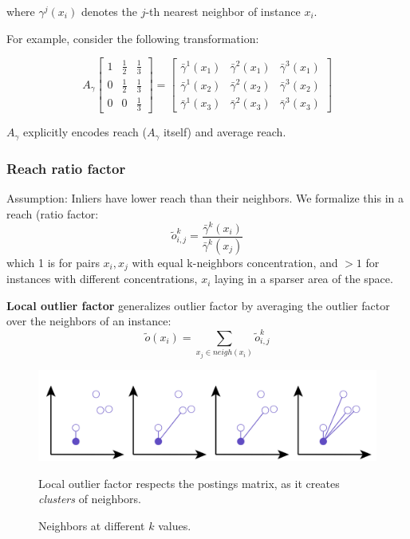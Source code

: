 where $\gamma^j(x_i)$ denotes the $j$-th nearest neighbor of instance $x_i$.

For example, consider the following transformation:

\[
A_{\gamma} \begin{bmatrix}
1 & \frac{1}{2} & \frac{1}{3} \\
0 & \frac{1}{2} & \frac{1}{3} \\
0 & 0 & \frac{1}{3}
\end{bmatrix} = \begin{bmatrix}
\bar{\gamma}^1(x_1) & \bar{\gamma}^2(x_1) & \bar{\gamma}^3(x_1) \\
\bar{\gamma}^1(x_2) & \bar{\gamma}^2(x_2) & \bar{\gamma}^3(x_2) \\
\bar{\gamma}^1(x_3) & \bar{\gamma}^2(x_3) & \bar{\gamma}^3(x_3)
\end{bmatrix}
\]

$A_{\gamma}$ explicitly encodes reach ($A_{\gamma}$ itself) and average reach.

\subsubsection{Reach ratio factor}
Assumption: Inliers have lower reach than their neighbors. We formalize this in a reach
(ratio factor:
\[
   \tilde{o}^k_{i,j} = \frac{\bar{\gamma}^k(x_i)}{\bar{\gamma}^k(x_j)}
\]
which 1 is for pairs $x_i,x_j$ with equal k-neighbors concentration, and $>1$  for instances
with different concentrations, $x_i$ laying in a sparser area of the space.
\nl

\begin{paracol}{2}

   \colfill
	\textbf{Local outlier factor} generalizes outlier factor by averaging the outlier factor over the
	neighbors of an instance:
	\[
		\tilde{o}(x_i) = \sum_{x_j \in neigh(x_i)} \tilde{o}^k_{i,j}
	\]
   \colfill

	\switchcolumn

	\begin{figure}[htbp]
		\centering
		\includegraphics[width=0.9\columnwidth]{images/06/reachneighbors.png}
		\caption{Neighbors at different $k$ values.}
		Local outlier factor respects the postings matrix, as it creates \textit{clusters} of neighbors.
		\label{fig:06/reachneighbors}
	\end{figure}
\end{paracol}


